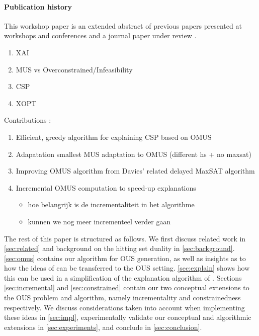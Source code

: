 {{\paragraph*{Publication history} This workshop paper is an extended abstract of previous papers presented at workshops and conferences \cite{claesuser,DBLP:conf/bnaic/ClaesBCGG19,ecai/BogaertsGCG20} and a journal paper under review \cite{bogaerts2020framework}.
}

\begin{enumerate}
    \item XAI
    \item MUS vs Overconstrained/Infeasibility
    \item CSP
    \item XOPT
\end{enumerate}

Contributions : 
\begin{enumerate}
    \item Efficient, greedy algorithm for explaining CSP based on OMUS 
    \item Adapatation smallest MUS adaptation to OMUS (different hs + no maxsat) 
    \item Improving OMUS algorithm from Davies' related delayed MaxSAT algorithm 
    \item Incremental OMUS computation to speed-up explanations
    \begin{itemize}
        \item hoe belangrijk is de incrementaliteit in het algorithme
        \item kunnen  we nog meer incrementeel verder gaan
    \end{itemize}
\end{enumerate}
}


The rest of this paper is structured as follows. We first discuss related work in \cref{sec:related} and background on the hitting set duality in \cref{sec:background}. \cref{sec:omus} contains our algorithm for OUS generation, as well as insights as to how the ideas of \citet{davies} can be transferred to the OUS setting. \cref{sec:explain} shows how this can be used in a simplification of the explanation algorithm of \citet{ecai/BogaertsGCG20}. 
Sections \ref{sec:incremental} and \ref{sec:constrained} contain our two conceptual extensions to the OUS problem and algorithm, namely incrementality and constrainedness respectively. 
We discuss considerations taken into account when implementing these ideas in \cref{sec:impl}, experimentally validate our  conceptual and algorithmic extensions in \cref{sec:experiments}, and conclude in \cref{sec:conclusion}.


